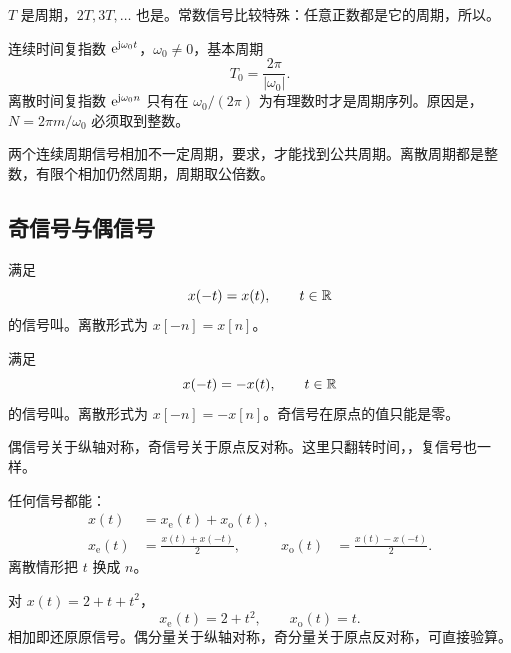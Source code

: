 $T$ 是周期，$2T,3T,\ldots$ 也是。常数信号比较特殊：任意正数都是它的周期，所以。

\begin{example}[复指数信号的周期性]
  连续时间复指数 $\mathrm{e}^{\mathrm{j}\omega_0t}$，$\omega_0\ne0$，基本周期
  \[
    T_0=\frac{2\pi}{|\omega_0|}.
  \]
  离散时间复指数 $\mathrm{e}^{\mathrm{j}\omega_0n}$ 只有在 $\omega_0/(2\pi)$ 为有理数时才是周期序列。原因是，$N=2\pi m/\omega_0$ 必须取到整数。
\end{example}

两个连续周期信号相加不一定周期，要求，才能找到公共周期。离散周期都是整数，有限个相加仍然周期，周期取公倍数。

\subsection{奇信号与偶信号}

\begin{definition}[偶信号]
  \label{def:even-signal}
  满足
  \[
    x(-t)=x(t),\qquad t\in\mathbb{R}
  \]
  的信号叫。离散形式为 $x[-n]=x[n]$。
\end{definition}

\begin{definition}[奇信号]
  \label{def:odd-signal}
  满足
  \[
    x(-t)=-x(t),\qquad t\in\mathbb{R}
  \]
  的信号叫。离散形式为 $x[-n]=-x[n]$。奇信号在原点的值只能是零。
\end{definition}

偶信号关于纵轴对称，奇信号关于原点反对称。这里只翻转时间，，复信号也一样。

\begin{theorem}[奇偶分解]
  任何信号都能：
  \begin{align}
    x(t)&=x_{\mathrm e}(t)+x_{\mathrm o}(t),
    \label{eq:even-odd-decomposition}\\
    x_{\mathrm e}(t)&=\frac{x(t)+x(-t)}{2},
    &x_{\mathrm o}(t)&=\frac{x(t)-x(-t)}{2}.
    \label{eq:even-odd-components}
  \end{align}
  离散情形把 $t$ 换成 $n$。
\end{theorem}

\begin{example}[分解多项式信号]
  对 $x(t)=2+t+t^2$，
  \[
    x_{\mathrm e}(t)=2+t^2,
    \qquad
    x_{\mathrm o}(t)=t.
  \]
  相加即还原原信号。偶分量关于纵轴对称，奇分量关于原点反对称，可直接验算。
\end{example}


